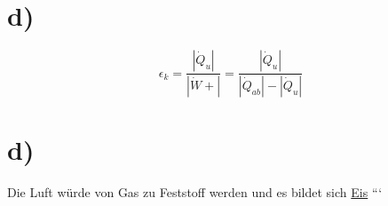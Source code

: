 

\section*{d)}
\[
\epsilon_k = \frac{|\dot{Q}_u|}{|\dot{W} + |} = \frac{|\dot{Q}_u|}{|\dot{Q}_{ab}| - |\dot{Q}_u|}
\]



\section*{d)}
Die Luft würde von Gas zu Feststoff werden und es bildet sich \underline{Eis}
```